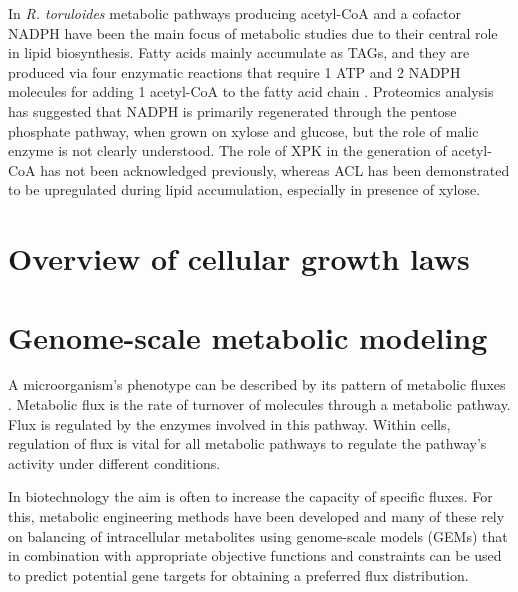 In \textit{R. toruloides} metabolic pathways producing acetyl-CoA and a cofactor NADPH
have been the main focus of metabolic studies due to their central role in lipid
biosynthesis. Fatty acids mainly accumulate as TAGs, and they are
produced via four enzymatic reactions that require 1 ATP and 2 NADPH molecules for adding 1 acetyl-CoA to the fatty acid chain \cite{Lian2015}.
Proteomics analysis has suggested that NADPH is primarily regenerated through the pentose phosphate pathway, when grown on xylose 
and glucose, but the role of malic enzyme is not clearly understood. The
role of XPK in the generation of acetyl-CoA has not been acknowledged previously, whereas
ACL has been demonstrated to be upregulated during lipid accumulation, especially in
presence of xylose.\cite{Rekena2023}




\section{Overview of cellular growth laws}

\section{Genome-scale metabolic modeling} %

A microorganism's phenotype can be described by its pattern of metabolic fluxes \cite{Kerkhoven2014}. Metabolic flux is the 
rate of turnover of molecules through a metabolic pathway. Flux is regulated by the enzymes involved in this pathway. Within cells, 
regulation of flux is vital for all metabolic pathways to regulate the pathway's activity under different conditions. \cite{Voet1995}

In biotechnology the aim is often to increase the capacity of specific fluxes. 
For this, metabolic engineering methods have been developed and many of these 
rely on balancing of intracellular metabolites using genome-scale models (GEMs) that in
combination with appropriate objective functions and constraints can be used to predict potential gene 
targets for obtaining a preferred flux distribution. \cite{Kerkhoven2014} 


